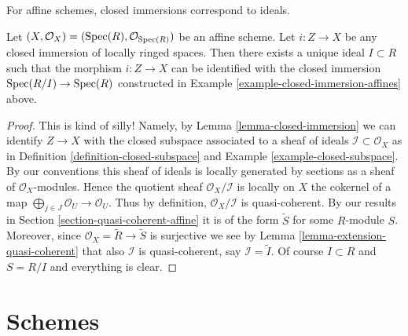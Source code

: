 \begin{lemma}
\label{lemma-closed-immersion-affine-case}
\begin{slogan}
For affine schemes, closed immersions correspond to ideals.
\end{slogan}
Let $(X, \mathcal{O}_X) = (\mathop{\mathrm{Spec}}(R), \mathcal{O}_{\mathop{\mathrm{Spec}}(R)})$
be an affine scheme. Let $i : Z \to X$ be any closed immersion
of locally ringed spaces. Then there exists a unique ideal
$I \subset R$ such that the morphism $i : Z \to X$ can be identified
with the closed immersion $\mathop{\mathrm{Spec}}(R/I) \to \mathop{\mathrm{Spec}}(R)$
constructed in Example \ref{example-closed-immersion-affines} above.
\end{lemma}

\begin{proof}
This is kind of silly! Namely, by Lemma \ref{lemma-closed-immersion}
we can identify $Z \to X$ with the closed subspace associated to
a sheaf of ideals $\mathcal{I} \subset \mathcal{O}_X$ as in
Definition \ref{definition-closed-subspace} and
Example \ref{example-closed-subspace}.
By our conventions this sheaf of ideals is locally generated
by sections as a sheaf of $\mathcal{O}_X$-modules.
Hence the quotient sheaf $\mathcal{O}_X / \mathcal{I}$
is locally on $X$ the cokernel
of a map $\bigoplus_{j \in J} \mathcal{O}_U \to \mathcal{O}_U$.
Thus by definition, $\mathcal{O}_X / \mathcal{I}$ is quasi-coherent.
By our results in Section \ref{section-quasi-coherent-affine}
it is of the form $\widetilde S$ for some $R$-module $S$.
Moreover, since $\mathcal{O}_X = \widetilde R \to \widetilde S$
is surjective we see by Lemma \ref{lemma-extension-quasi-coherent}
that also $\mathcal{I}$ is quasi-coherent, say $\mathcal{I} = \widetilde I$.
Of course $I \subset R$ and $S = R/I$ and everything is clear.
\end{proof}













\section{Schemes}
\label{section-schemes}

